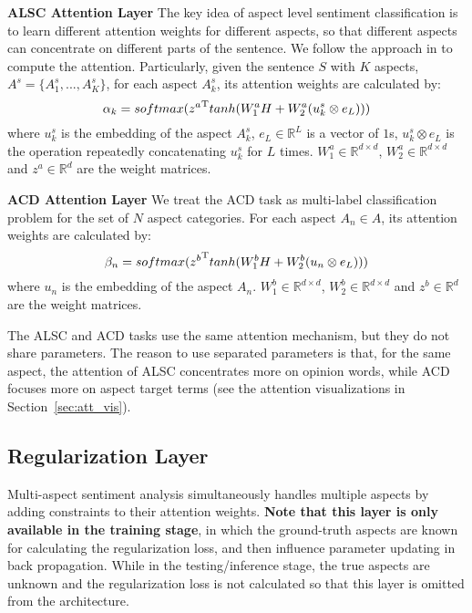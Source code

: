 \documentclass[11pt,a4paper]{article}
\begin{document}
{\bf ALSC Attention Layer}
The key idea of aspect level sentiment classification is to learn different attention weights for different aspects, so that different aspects can concentrate on different parts of the sentence. 
We follow the approach in \cite{Bahdanau2015iclr} to compute the attention. Particularly, given the sentence $S$ with $K$ aspects, $A^s=\{A_1^s,...,A_K^s\}$, for each aspect $A_k^s$, its attention weights are calculated by:
\begin{equation} 
\setlength{\abovedisplayskip}{4pt}  %
\setlength{\belowdisplayskip}{4pt}  %
    \alpha_k = softmax({z^a}^\mathrm{T}tanh(W_{1}^{a}{H} + W_{2}^{a}(u_k^{s}\otimes{e_L}))) 
  \label{equation_absa_att}
\end{equation}
where $u_k^{s}$ is the embedding of the aspect $A_k^s$, $e_L\in\mathbb{R}^{L}$ is a
vector of $1$s, ${u_k^{s}}\otimes{e_L}$ is the operation repeatedly concatenating $u_k^{s}$ for $L$ times. $W_{1}^a\in\mathbb{R}^{{d}\times{d}}$, $W_{2}^a\in\mathbb{R}^{{d}\times{d}}$ and $z^a\in\mathbb{R}^{d}$ are the weight matrices.

{\bf ACD Attention Layer} We treat the ACD task as multi-label classification problem for the set of $N$ aspect categories. For each aspect $A_n\in A$, its attention weights are calculated by:
\begin{equation} 
\setlength{\abovedisplayskip}{4pt}  %
\setlength{\belowdisplayskip}{4pt}  %
    \beta_n = softmax({z^b}^\mathrm{T}tanh(W_{1}^{b}{H} + W_{2}^{b}(u_n\otimes{e_L}))) 
  \label{equation_acd_att}
\end{equation}
where $u_n$ is the embedding of the aspect $A_n$. $W_{1}^b\in\mathbb{R}^{{d}\times{d}}$, $W_{2}^b\in\mathbb{R}^{{d}\times{d}}$ and $z^b\in\mathbb{R}^{d}$ are the weight matrices.

The ALSC and ACD tasks use the same attention mechanism, but they do not share parameters. The reason to use separated parameters is that, for the same aspect, the attention of ALSC concentrates more on opinion words, while ACD focuses more on aspect target terms (see the attention visualizations in Section~\ref{sec:att_vis}). 

\subsection{Regularization Layer}
Multi-aspect sentiment analysis simultaneously handles multiple aspects by adding constraints to their attention weights. {\bf Note that this layer is only available in the training stage}, in which the ground-truth aspects are known for calculating the regularization loss, and then influence parameter updating in back propagation. While in the testing/inference stage, the true aspects are unknown and the regularization loss is not calculated so that this layer is omitted from the architecture.  
\end{document}
